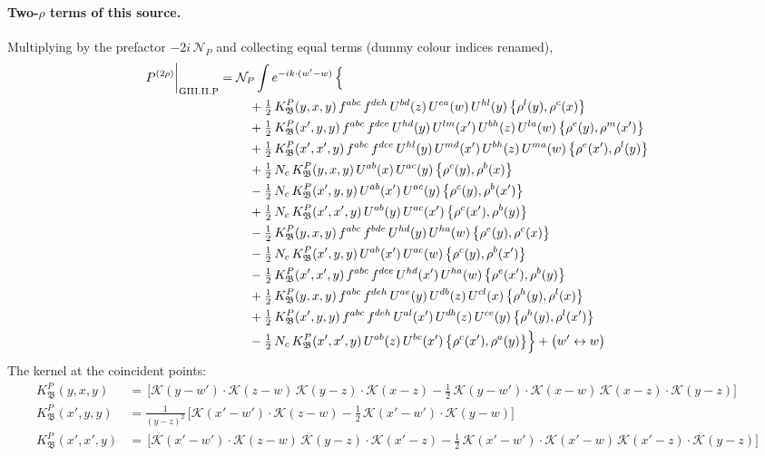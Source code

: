 \documentclass[10pt]{article}
\numberwithin{equation}{section}
\newcommand{\KK}{\mathcal K}
\newcommand{\NP}{\mathcal N_{P}}
\begin{document}
\paragraph{Two-$\rho$ terms of this source.} Multiplying by the prefactor $-2i\,\NP$ and collecting equal terms (dummy colour indices renamed),
\begin{align}
P^{(2\rho)}\bigg|_{\rm GIII.II.P}={}&\NP\int e^{-ik\cdot(w'-w)}\,\Big\{\notag\\
&\quad +\tfrac12\,K^{P}_{\mathfrak B}(y,x,y)\,f^{abc}\,f^{deh}\,U^{bd}(z)\,U^{ea}(w)\,U^{hl}(y)\,\big\{\rho^{l}(y),\rho^{c}(x)\big\}\notag\\
&\quad +\tfrac12\,K^{P}_{\mathfrak B}(x',y,y)\,f^{abc}\,f^{dce}\,U^{hd}(y)\,U^{lm}(x')\,U^{bh}(z)\,U^{la}(w)\,\big\{\rho^{e}(y),\rho^{m}(x')\big\}\notag\\
&\quad +\tfrac12\,K^{P}_{\mathfrak B}(x',x',y)\,f^{abc}\,f^{dce}\,U^{hl}(y)\,U^{md}(x')\,U^{bh}(z)\,U^{ma}(w)\,\big\{\rho^{e}(x'),\rho^{l}(y)\big\}\notag\\
&\quad +\tfrac12\,N_{c}\,K^{P}_{\mathfrak B}(y,x,y)\,U^{ab}(x)\,U^{ac}(y)\,\big\{\rho^{c}(y),\rho^{b}(x)\big\}\notag\\
&\quad -\tfrac12\,N_{c}\,K^{P}_{\mathfrak B}(x',y,y)\,U^{ab}(x')\,U^{ac}(y)\,\big\{\rho^{c}(y),\rho^{b}(x')\big\}\notag\\
&\quad +\tfrac12\,N_{c}\,K^{P}_{\mathfrak B}(x',x',y)\,U^{ab}(y)\,U^{ac}(x')\,\big\{\rho^{c}(x'),\rho^{b}(y)\big\}\notag\\
&\quad -\tfrac12\,K^{P}_{\mathfrak B}(y,x,y)\,f^{abc}\,f^{bde}\,U^{hd}(y)\,U^{ha}(w)\,\big\{\rho^{e}(y),\rho^{c}(x)\big\}\notag\\
&\quad -\tfrac12\,N_{c}\,K^{P}_{\mathfrak B}(x',y,y)\,U^{ab}(x')\,U^{ac}(w)\,\big\{\rho^{c}(y),\rho^{b}(x')\big\}\notag\\
&\quad -\tfrac12\,K^{P}_{\mathfrak B}(x',x',y)\,f^{abc}\,f^{dce}\,U^{hd}(x')\,U^{ha}(w)\,\big\{\rho^{e}(x'),\rho^{b}(y)\big\}\notag\\
&\quad +\tfrac12\,K^{P}_{\mathfrak B}(y,x,y)\,f^{abc}\,f^{deh}\,U^{ae}(y)\,U^{db}(z)\,U^{cl}(x)\,\big\{\rho^{h}(y),\rho^{l}(x)\big\}\notag\\
&\quad +\tfrac12\,K^{P}_{\mathfrak B}(x',y,y)\,f^{abc}\,f^{deh}\,U^{al}(x')\,U^{db}(z)\,U^{ce}(y)\,\big\{\rho^{h}(y),\rho^{l}(x')\big\}\notag\\
&\quad -\tfrac12\,N_{c}\,K^{P}_{\mathfrak B}(x',x',y)\,U^{ab}(z)\,U^{bc}(x')\,\big\{\rho^{c}(x'),\rho^{a}(y)\big\}\Big\}+\big(w'\leftrightarrow w\big)\label{eq:res-GIII.II.P}
\end{align}
The kernel at the coincident points:
\begin{align*}
K^{P}_{\mathfrak B}(y,x,y)&=\,\Big[\KK(y-w')\cdot\KK(z-w)\,\KK(y-z)\cdot\KK(x-z)-\frac{1}{2}\,\KK(y-w')\cdot\KK(x-w)\,\KK(x-z)\cdot\KK(y-z)\Big]\\K^{P}_{\mathfrak B}(x',y,y)&=\frac{1}{(y-z)^2}\,\Big[\KK(x'-w')\cdot\KK(z-w)-\frac{1}{2}\,\KK(x'-w')\cdot\KK(y-w)\Big]\\K^{P}_{\mathfrak B}(x',x',y)&=\,\Big[\KK(x'-w')\cdot\KK(z-w)\,\KK(y-z)\cdot\KK(x'-z)-\frac{1}{2}\,\KK(x'-w')\cdot\KK(x'-w)\,\KK(x'-z)\cdot\KK(y-z)\Big]
\end{align*}
\end{document}
